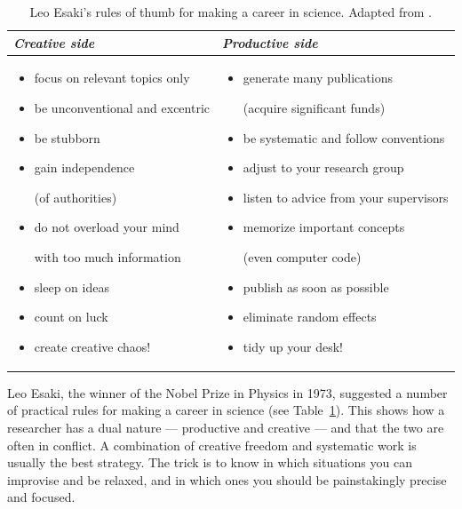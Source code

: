 \documentclass[graybox,envcountchap,sectrefs,UStrade]{svmono}
\begin{document}
\begin{table}[!htb]
\centering \caption{Leo Esaki's rules of thumb for making a career in science. Adapted from \citet{AscheronKickuth2004}.}\label{Tbl:Esaki} %
\begin{tabular}{m{}m{}}
\toprule
  \emph{Creative side} & \emph{Productive side} \\ \midrule
  \begin{itemize}
    \item focus on relevant topics only
    \item be unconventional and excentric
    \item be stubborn
    \item gain independence \par (of authorities)
    \item do not overload your mind \par with too much information
    \item sleep on ideas
    \item count on luck
    \item create creative chaos!
  \end{itemize}
   &
   \begin{itemize}
     \item generate many publications \par (acquire significant funds)
     \item be systematic and follow conventions
     \item adjust to your research group
     \item listen to advice from your supervisors
     \item memorize important concepts \par (even computer code)
     \item publish as soon as possible
     \item eliminate random effects
     \item tidy up your desk!
   \end{itemize} \\
\bottomrule
\end{tabular}
\end{table}

Leo Esaki, the winner of the Nobel Prize in Physics in 1973, suggested a number of practical rules for making a career in science (see Table~\ref{Tbl:Esaki}). This shows how a researcher has a dual nature --- productive and creative --- and that the two are often in conflict. A combination of creative freedom and systematic work is usually the best strategy. The trick is to know in which situations you can improvise and be relaxed, and in which ones you should be painstakingly precise and focused. \par
\end{document}
